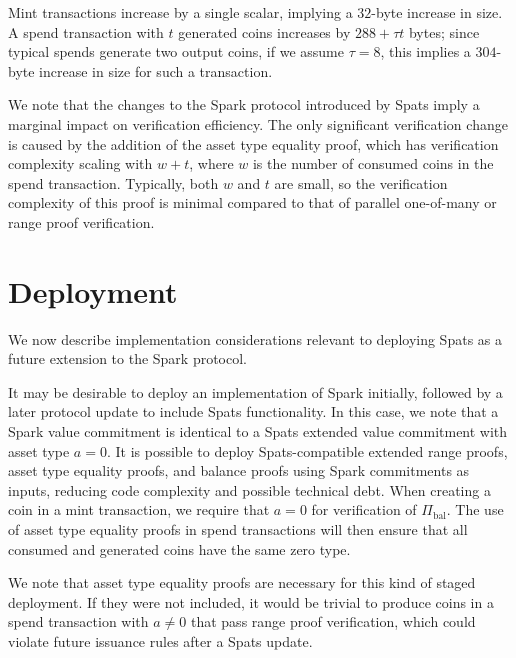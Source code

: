 \documentclass{article}
\begin{document}
Mint transactions increase by a single scalar, implying a $32$-byte increase in size.
A spend transaction with $t$ generated coins increases by $288 + \tau t$ bytes; since typical spends generate two output coins, if we assume $\tau = 8$, this implies a $304$-byte increase in size for such a transaction.

We note that the changes to the Spark protocol introduced by Spats imply a marginal impact on verification efficiency.
The only significant verification change is caused by the addition of the asset type equality proof, which has verification complexity scaling with $w + t$, where $w$ is the number of consumed coins in the spend transaction.
Typically, both $w$ and $t$ are small, so the verification complexity of this proof is minimal compared to that of parallel one-of-many or range proof verification.


\section{Deployment}

We now describe implementation considerations relevant to deploying Spats as a future extension to the Spark protocol.

It may be desirable to deploy an implementation of Spark initially, followed by a later protocol update to include Spats functionality.
In this case, we note that a Spark value commitment is identical to a Spats extended value commitment with asset type $a = 0$.
It is possible to deploy Spats-compatible extended range proofs, asset type equality proofs, and balance proofs using Spark commitments as inputs, reducing code complexity and possible technical debt.
When creating a coin in a mint transaction, we require that $a = 0$ for verification of $\Pi_{\text{bal}}$.
The use of asset type equality proofs in spend transactions will then ensure that all consumed and generated coins have the same zero type.

We note that asset type equality proofs are necessary for this kind of staged deployment.
If they were not included, it would be trivial to produce coins in a spend transaction with $a \neq 0$ that pass range proof verification, which could violate future issuance rules after a Spats update.
\end{document}
